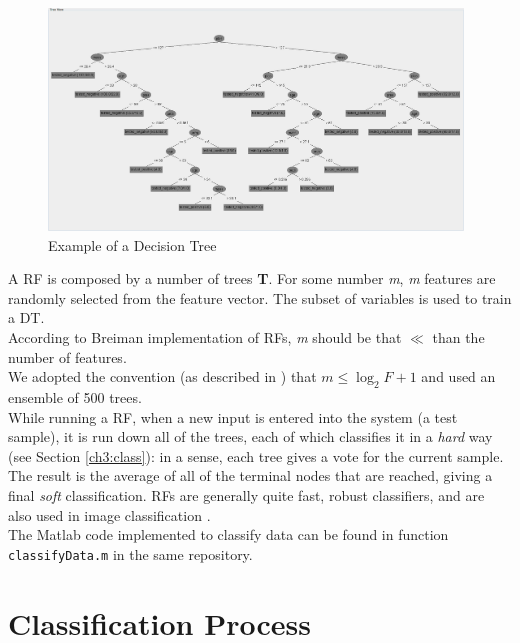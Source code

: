 \begin{figure}[!hbt]
  \centering
    \includegraphics[width=0.98\textwidth]{./images/DT_example.png}
  \caption{Example of a Decision Tree}
  \label{ch4:fig6}
\end{figure}

A \Gls{RF} is composed by a number of trees \textbf{T}. For some number \textit{m}, \textit{m} features are randomly selected from the feature vector.
The subset of variables is used to train a \Gls{DT}.\\
According to Breiman implementation of \Glspl{RF}, \textit{m} should be that  $\ll$ than the number of features.\\
We adopted the convention (as described in \cite{randForests03}) that $m \leq \log_2 F +1$ and used an ensemble of 500 trees.\\
While running a \Gls{RF}, when a new input is entered into the system (a test sample), it is run down all of the trees, each of which classifies
it in a \textit{hard} way (see Section \ref{ch3:class}): in a sense, each tree gives a vote for the current sample. 
The result is the average  of all of the terminal nodes that are reached, giving a final \textit{soft} classification.
\Glspl{RF} are generally quite fast, robust classifiers, and are also used in image classification \cite{randForests04}.
\\
The Matlab code implemented to classify data can be found in function \texttt{classifyData.m} in the same repository.

\vspace{0.5cm}


\section{Classification Process}

